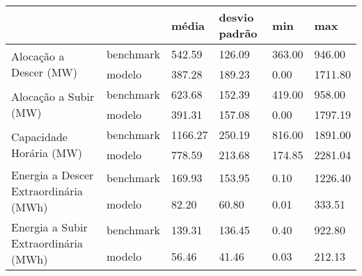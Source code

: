 \begin{tabular}{llllll}
\toprule
 &  & média & desvio padrão & min & max \\
\midrule
\multirow[t]{2}{*}{Alocação a Descer (MW)} & benchmark & 542.59 & 126.09 & 363.00 & 946.00 \\
 & modelo & 387.28 & 189.23 & 0.00 & 1711.80 \\
\cline{1-6}
\multirow[t]{2}{*}{Alocação a Subir (MW)} & benchmark & 623.68 & 152.39 & 419.00 & 958.00 \\
 & modelo & 391.31 & 157.08 & 0.00 & 1797.19 \\
\cline{1-6}
\multirow[t]{2}{*}{Capacidade Horária (MW)} & benchmark & 1166.27 & 250.19 & 816.00 & 1891.00 \\
 & modelo & 778.59 & 213.68 & 174.85 & 2281.04 \\
\cline{1-6}
\multirow[t]{2}{*}{Energia a Descer Extraordinária (MWh)} & benchmark & 169.93 & 153.95 & 0.10 & 1226.40 \\
 & modelo & 82.20 & 60.80 & 0.01 & 333.51 \\
\cline{1-6}
\multirow[t]{2}{*}{Energia a Subir Extraordinária (MWh)} & benchmark & 139.31 & 136.45 & 0.40 & 922.80 \\
 & modelo & 56.46 & 41.46 & 0.03 & 212.13 \\
\cline{1-6}
\bottomrule
\end{tabular}
